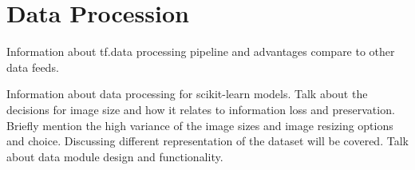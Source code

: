 \section{Data Procession}
Information about tf.data processing pipeline and advantages compare to other data feeds.

Information about data processing for scikit-learn models.
Talk about the decisions for image size and how it relates to information loss and preservation. Briefly mention the high variance of the image sizes and image resizing options and choice.
Discussing different representation of the dataset will be covered.
Talk about data module design and functionality.
\clearpage
